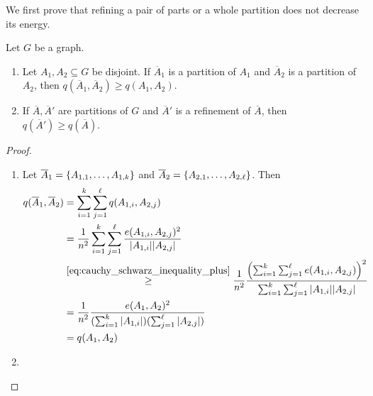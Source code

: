         We first prove that refining a pair of parts or a whole partition does not decrease its energy.
        \begin{lemma} \label{lem:energy_does_not_decrease_when_refining}
            Let $G$ be a graph.
            \begin{enumerate}
                \item Let $A_1, A_2 \subseteq G$ be disjoint.
                    If $\overline{A}_1$ is a partition of $A_1$ and $\overline{A}_2$ is a partition of $A_2$, then
                    $q(\overline{A}_1, \overline{A}_2) \geq q(A_1, A_2)$.
                \item If $\overline{A}, \overline{A}'$ are partitions of $G$ and $\overline{A}'$ is a refinement of
                    $\overline{A}$, then $q(\overline{A}') \geq q(\overline{A})$.
            \end{enumerate}
            \begin{proof}
                \begin{enumerate}
                    \item \label{lem:energy_does_not_decrease_when_refining.1}
                        Let $\overline{A}_1 = \{ A_{1,1}, \dots, A_{1,k} \}$ and
                        $\overline{A}_2 = \{ A_{2,1}, \dots, A_{2,\ell} \}$.
                        Then
                        \begin{align*}
                            q(\overline{A}_1, \overline{A}_2)
                                & = \sum_{i=1}^k \sum_{j=1}^\ell q(A_{1,i}, A_{2,j}) \\
                                & = \frac{1}{n^2} \sum_{i=1}^k \sum_{j=1}^\ell \frac{e(A_{1,i}, A_{2,j})^2}{|A_{1,i}||A_{2,j}|} \\
                                & \stackrel{\eqref{eq:cauchy_schwarz_inequality_plus}}{\geq} \frac{1}{n^2}
                                    \frac{\left( \sum_{i=1}^k \sum_{j=1}^\ell e(A_{1,i}, A_{2,j}) \right)^2}
                                    {\sum_{i=1}^k \sum_{j=1}^\ell |A_{1,i}||A_{2,j}|} \\
                                & = \frac{1}{n^2} \frac{e(A_1, A_2)^2}
                                    {(\sum_{i=1}^k |A_{1,i}|)(\sum_{j=1}^\ell |A_{2,j}|)} \\
                                & = q(A_1, A_2)
                        \end{align*}
                    \item \label{lem:energy_does_not_decrease_when_refining.2}

\end{enumerate}
\end{proof}
\end{lemma}
